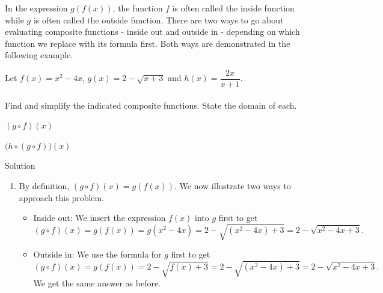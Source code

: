 In the expression $g(f(x))$, the function $f$ is often called the inside function while $g$ is often called the outside function.  There are two ways to go about evaluating composite functions - inside out and outside in - depending on which function we replace with its formula first.  Both ways are  demonstrated in the following example.  

\begin{example}
\label{fcexform}
 Let $f(x) = x^2-4x$, \;  $g(x) = 2-\sqrt{x+3}$\; and  $h(x) = \dfrac{2x}{x+1}.$ \\
 \\
 Find and simplify the indicated composite functions. State the domain of each.

\begin{enumerate}
\begin{multicols}{2}
\item  $(g \circ f)(x)$ \label{fcexformfirst}
\item  $\big(h \circ (g \circ f)\big)(x)$ 
\end{multicols}

\end{enumerate}

Solution 

\begin{enumerate}
\item  By definition, $(g \circ f)(x) = g(f(x))$. We now illustrate two ways to approach this problem.

\begin{itemize}

\item  Inside out:  We insert the expression $f(x)$ into $g$ first to get  \[(g \circ f)(x) = g(f(x)) = g\left(x^2-4x\right) = 2 - \sqrt{\left(x^2-4x\right)+3} = 2 - \sqrt{x^2-4x+3}.\] 


\item  Outside in:  We use the formula for $g$ first to get  \[(g \circ f)(x) = g(f(x)) = 2 - \sqrt{f(x)+3}  = 2 - \sqrt{\left(x^2-4x\right)+3} = 2 - \sqrt{x^2-4x+3}.\]
 We get the same answer as before.

\end{itemize} 


\end{enumerate}
\end{example}
